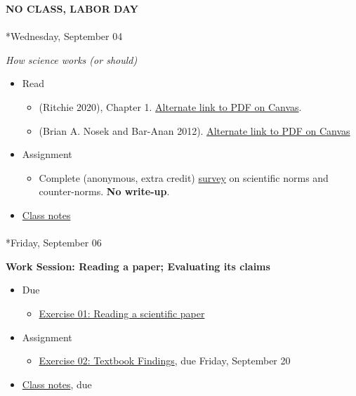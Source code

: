 \documentclass[
  letterpaper,
  DIV=11,
  numbers=noendperiod]{scrartcl}
\makeatletter
\let\oldparagraph\paragraph
\renewcommand{\paragraph}{
    \@ifstar
      \xxxParagraphStar
      \xxxParagraphNoStar
  }
\newcommand{\xxxParagraphStar}[1]{\oldparagraph*{#1}\mbox{}}
\newcommand{\xxxParagraphNoStar}[1]{\oldparagraph{#1}\mbox{}}
\providecommand{\tightlist}{%
  \setlength{\itemsep}{0pt}\setlength{\parskip}{0pt}}\usepackage{longtable,booktabs,array}
\makeatother
\begin{document}
\textbf{NO CLASS, LABOR DAY}

\paragraph*{Wednesday, September 04}\label{wednesday-september-04}

\emph{How science works (or should)}

\begin{itemize}
\tightlist
\item
  Read

  \begin{itemize}
  \tightlist
  \item
    (Ritchie 2020), Chapter 1.
    \href{https://psu.instructure.com/courses/2350148/files/folder/readings?preview=165170709}{Alternate
    link to PDF on Canvas}.
  \item
    (Brian A. Nosek and Bar-Anan 2012).
    \href{https://psu.instructure.com/courses/2350148/files/folder/readings?preview=165170711}{Alternate
    link to PDF on Canvas}
  \end{itemize}
\item
  {Assignment}

  \begin{itemize}
  \tightlist
  \item
    Complete (anonymous, extra credit)
    \href{https://forms.gle/zGm5vZsPrTxwRDVR7}{survey} on scientific
    norms and counter-norms. \textbf{No write-up}.
  \end{itemize}
\item
  \href{notes/wk02-2024-09-04-how-science-works.qmd}{Class notes}
\end{itemize}

\paragraph*{Friday, September 06}\label{friday-september-06}

\textbf{Work Session: Reading a paper; Evaluating its claims}

\begin{itemize}
\tightlist
\item
  {Due}

  \begin{itemize}
  \tightlist
  \item
    \href{exercises/ex01-read-a-scientific-paper.qmd}{Exercise 01:
    Reading a scientific paper}
  \end{itemize}
\item
  {Assignment}

  \begin{itemize}
  \tightlist
  \item
    \href{exercises/ex02-textbook-findings.qmd}{Exercise 02: Textbook
    Findings}, {due Friday, September 20}
  \end{itemize}
\item
  \href{notes/wk02-2024-09-06-claims.qmd}{Class notes}, due
\end{itemize}
\end{document}
